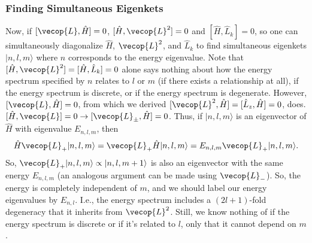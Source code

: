\subsubsection{Finding Simultaneous Eigenkets}
Now, if $[\vecop{L}, \hat{H}]=0$, $[\hat{H}, \vecop{L}^2]=0$ and $[\hat{H}, \hat{L}_k]=0$, so one can simultaneously diagonalize $\hat{H}$, $\vecop{L}^2$, and $\hat{L}_k$ to find simultaneous eigenkets $|n, l, m\rangle$ where $n$ corresponds to the energy eigenvalue. Note that $[\hat{H}, \vecop{L}^2]=[\hat{H}, \hat{L}_k]=0$ alone says nothing about how the energy spectrum specified by $n$ relates to $l$ or $m$ (if there exists a relationship at all), if the energy spectrum is discrete, or if the energy spectrum is degenerate. However, $[\vecop{L}, \hat{H}]=0$, from which we derived $[\vecop{L}^2, \hat{H}]=[\hat{L}_z,\hat{H}]=0$, does. $[\hat{H},\vecop{L}]=0\rightarrow [\vecop{L}_{\pm},\hat{H}]=0$. Thus, if $|n,l,m\rangle$ is an eigenvector of $\hat{H}$ with eigenvalue $E_{n,l,m}$, then
\begin{align*}
    \hat{H}\vecop{L}_+|n,l,m\rangle = \vecop{L}_+\hat{H}|n,l,m\rangle = E_{n,l,m}\vecop{L}_+|n,l,m\rangle.
\end{align*} 
So, $\vecop{L}_+|n,l,m\rangle\propto|n,l,m+1\rangle$ is also an eigenvector with the same energy $E_{n,l,m}$ (an analogous argument can be made using $\vecop{L}_-$). So, the energy is completely independent of $m$, and we should label our energy eigenvalues by $E_{n,l}$. I.e., the energy spectrum includes a $(2l+1)$-fold degeneracy that it inherits from $\vecop{L}^2$. Still, we know nothing of if the energy spectrum is discrete or if it's related to $l$, only that it cannot depend on $m$.\\

